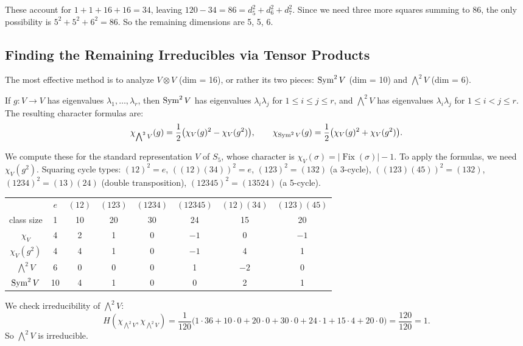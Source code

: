 \documentclass{report}
\begin{document}
These account for \(1 + 1 + 16 + 16 = 34\), leaving \(120 - 34 = 86 = d_5^2 + d_6^2 + d_7^2\). Since we need three more squares summing to 86, the only possibility is \(5^2 + 5^2 + 6^2 = 86\). So the remaining dimensions are 5, 5, 6.

\subsection{Finding the Remaining Irreducibles via Tensor Products}

The most effective method is to analyze \(V \otimes V\) (dim = 16), or rather its two pieces: \(\operatorname{Sym}^2 V\) (dim = 10) and \(\bigwedge^2 V\) (dim = 6).

If \(g : V \to V\) has eigenvalues \(\lambda_1, \ldots, \lambda_r\), then \(\operatorname{Sym}^2 V\) has eigenvalues \(\lambda_i \lambda_j\) for \(1 \leq i \leq j \leq r\), and \(\bigwedge^2 V\) has eigenvalues \(\lambda_i \lambda_j\) for \(1 \leq i < j \leq r\). The resulting character formulas are:
\[\chi_{\bigwedge^2 V}(g) = \frac{1}{2}\bigl(\chi_V(g)^2 - \chi_V(g^2)\bigr), \qquad \chi_{\operatorname{Sym}^2 V}(g) = \frac{1}{2}\bigl(\chi_V(g)^2 + \chi_V(g^2)\bigr).\]

We compute these for the standard representation \(V\) of \(S_5\), whose character is \(\chi_V(\sigma) = |\operatorname{Fix}(\sigma)| - 1\). To apply the formulas, we need \(\chi_V(g^2)\). Squaring cycle types: \((12)^2 = e\), \(((12)(34))^2 = e\), \((123)^2 = (132)\) (a 3-cycle), \(((123)(45))^2 = (132)\), \((1234)^2 = (13)(24)\) (double transposition), \((12345)^2 = (13524)\) (a 5-cycle).

\begin{center}
\begin{tabular}{c|ccccccc}
& \(e\) & \((12)\) & \((123)\) & \((1234)\) & \((12345)\) & \((12)(34)\) & \((123)(45)\) \\
class size & 1 & 10 & 20 & 30 & 24 & 15 & 20 \\ \hline
\(\chi_V\) & 4 & 2 & 1 & 0 & \(-1\) & 0 & \(-1\) \\
\(\chi_V(g^2)\) & 4 & 4 & 1 & 0 & \(-1\) & 4 & 1 \\
\(\bigwedge^2 V\) & 6 & 0 & 0 & 0 & 1 & \(-2\) & 0 \\
\(\operatorname{Sym}^2 V\) & 10 & 4 & 1 & 0 & 0 & 2 & 1
\end{tabular}
\end{center}

We check irreducibility of \(\bigwedge^2 V\):
\[H(\chi_{\bigwedge^2 V}, \chi_{\bigwedge^2 V}) = \frac{1}{120}\bigl(1 \cdot 36 + 10 \cdot 0 + 20 \cdot 0 + 30 \cdot 0 + 24 \cdot 1 + 15 \cdot 4 + 20 \cdot 0\bigr) = \frac{120}{120} = 1.\]
So \(\bigwedge^2 V\) is irreducible.
\end{document}
